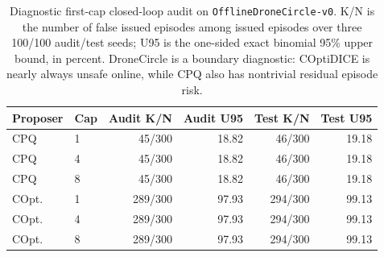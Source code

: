 \begin{table}[t]
\centering
\scriptsize
\setlength{\tabcolsep}{3pt}
\begin{tabular}{llrrrr}
\toprule
Proposer & Cap & Audit K/N & Audit U95 & Test K/N & Test U95 \\
\midrule
CPQ & 1 & 45/300 & 18.82 & 46/300 & 19.18 \\
CPQ & 4 & 45/300 & 18.82 & 46/300 & 19.18 \\
CPQ & 8 & 45/300 & 18.82 & 46/300 & 19.18 \\
\midrule
COpt. & 1 & 289/300 & 97.93 & 294/300 & 99.13 \\
COpt. & 4 & 289/300 & 97.93 & 294/300 & 99.13 \\
COpt. & 8 & 289/300 & 97.93 & 294/300 & 99.13 \\
\bottomrule
\end{tabular}
\caption{Diagnostic first-cap closed-loop audit on \texttt{OfflineDroneCircle-v0}. K/N is the number of false issued episodes among issued episodes over three 100/100 audit/test seeds; U95 is the one-sided exact binomial 95\% upper bound, in percent. DroneCircle is a boundary diagnostic: COptiDICE is nearly always unsafe online, while CPQ also has nontrivial residual episode risk.}
\label{tab:first-cap-closed-loop-drone}
\end{table}
